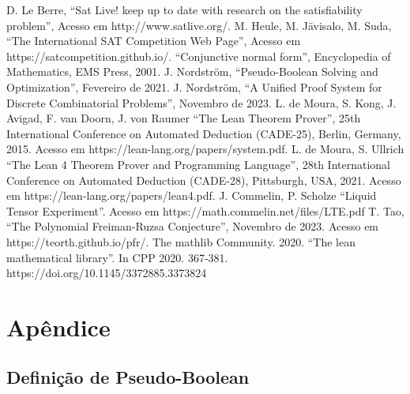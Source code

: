 \documentclass[conference]{IEEEtran}
\begin{document}
\begin{thebibliography}{00}
           D. Le Berre, ``Sat Live! keep up to date with research on the satisfiability problem'', Acesso em http://www.satlive.org/.
           M. Heule, M. Jävisalo, M. Suda, ``The International SAT Competition Web Page'', Acesso em https://satcompetition.github.io/.
               ``Conjunctive normal form'', Encyclopedia of Mathematics, EMS Press, 2001.
           J. Nordström, ``Pseudo-Boolean Solving and Optimization'', Fevereiro de 2021.
          J. Nordström, ``A Unified Proof System for Discrete Combinatorial Problems'', Novembro de 2023.
        L. de Moura, S. Kong, J. Avigad, F. van Doorn, J. von Raumer ``The Lean Theorem Prover'', 25th International Conference on Automated Deduction (CADE-25), Berlin, Germany, 2015. Acesso em https://lean-lang.org/papers/system.pdf.
             L. de Moura, S. Ullrich ``The Lean 4 Theorem Prover and Programming Language'', 28th International Conference on Automated Deduction (CADE-28), Pittsburgh, USA, 2021. Acesso em https://lean-lang.org/papers/lean4.pdf.
               J. Commelin, P. Scholze ``Liquid Tensor Experiment''. Acesso em https://math.commelin.net/files/LTE.pdf
               T. Tao, ``The Polynomial Freiman-Ruzsa Conjecture'', Novembro de 2023. Acesso em https://teorth.github.io/pfr/.
          The mathlib Community. 2020. ``The lean mathematical library''. In CPP 2020. 367-381. https://doi.org/10.1145/3372885.3373824
\end{thebibliography}

\vspace{12pt}

\newpage

\section{Apêndice}

\subsection{Definição de Pseudo-Boolean}







\end{document}
